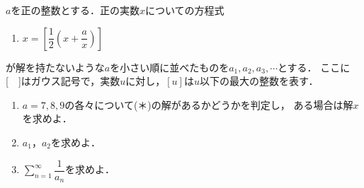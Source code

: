\documentclass[../../main.tex]{subfiles}
\begin{document}
$a$を正の整数とする．正の実数$x$についての方程式
\begin{enumerate}
  \item[(＊)]$\displaystyle x= \left[ \dfrac{1}{2}\left(x+\dfrac{a}{x}\right) \right]$
\end{enumerate}
が解を持たないような$a$を小さい順に並べたものを$a_1,a_2,a_3,\cdots$とする．
ここに[　]はガウス記号で，実数$u$に対し，$[u]$は$u$以下の最大の整数を表す．
\begin{enumerate}
  \item $a=7,8,9$の各々について(＊)の解があるかどうかを判定し，
    ある場合は解$x$を求めよ．
  \item $a_1$，$a_2$を求めよ．
  \item $\displaystyle\sum_{n=1}^\infty\dfrac{1}{a_n}$を求めよ．
\end{enumerate}
\end{document}
